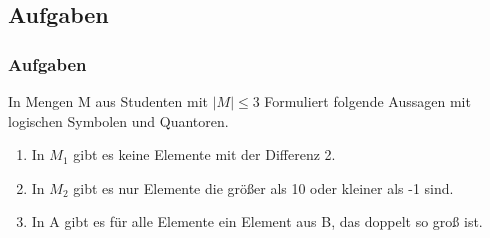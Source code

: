 \documentclass{beamer}
\begin{document}
\subsection{Aufgaben}
\begin{frame}
  \frametitle{Aufgaben}
  \begin{exampleblock}{In Mengen M aus Studenten mit $|M| \leq 3$}
    Formuliert folgende Aussagen mit logischen Symbolen und Quantoren.
    \begin{enumerate}
      \item In $M_1$ gibt es keine Elemente mit der Differenz 2.
      \item In $M_2$ gibt es nur Elemente die größer als 10 oder kleiner als -1 sind.
      \item In A gibt es für alle Elemente ein Element aus B, das doppelt so groß ist.
    \end{enumerate}
  \end{exampleblock}
\end{frame}
\end{document}
